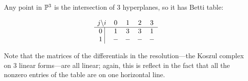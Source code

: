 \begin{example}[A point in $\PP^3$]
Any point in $\PP^3$ is the intersection of 3 hyperplanes, so it has Betti table:
\begin{small}
$$
\begin{matrix}
j \backslash i &0&1&2&3\\ \hline
\text{0 }\vline &1&3&3&1\\
\text{1 }\vline &-&-&-&-\\
\end{matrix}
$$
\end{small}
Note that the matrices of the differentials in the resolution---the Koszul complex on 3 linear forms---are all linear; again, this is reflect in the fact that all the 
nonzero entries of the table are on one horizontal line.
\end{example}

